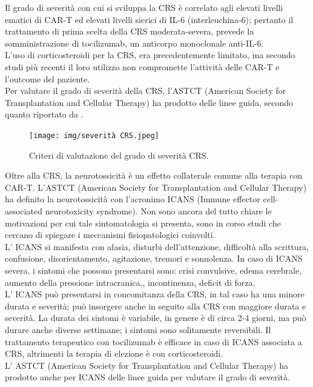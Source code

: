 Il grado di severità con cui si sviluppa la CRS è correlato agli elevati livelli ematici di CAR-T ed elevati livelli 
sierici di IL-6 (interleuchina-6); pertanto il trattamento di prima scelta della CRS moderata-severa, 
prevede la somministrazione di tocilizumab, un anticorpo monoclonale anti-IL-6\cite{EMATOCART}.\\
L’uso di corticosteroidi per la CRS, era precedentemente limitato, ma secondo studi più recenti il loro utilizzo 
non compromette l'attività delle CAR-T e l’outcome del paziente\cite{Cortico}.\\
Per valutare il grado di severità della CRS, l’ASTCT (American Society for Transplantation and Cellular Therapy) 
ha prodotto delle linee guida, secondo quanto riportato da \cite{ASTCT}.\\

\begin{figure}[H]
    \begin{center}
    \texttt{[image: img/severità CRS.jpeg]}
    \end{center}
    \caption[Criteri di valutazione del grado di severità CRS.]{Criteri di valutazione del grado di severità CRS.
    \cite{img26}}

\end{figure}

Oltre alla CRS, la neurotossicità è un effetto collaterale comune alla terapia con CAR-T. 
L’ASTCT (American Society for Transplantation and Cellular Therapy) ha definito la neurotossicità con 
l’acronimo ICANS (Immune effector cell-associated neurotoxicity syndrome). Non sono ancora del tutto chiare le 
motivazioni per cui tale sintomatologia si presenta, sono in corso studi che cercano di spiegare i meccanismi 
fisiopatologici coinvolti.\\
L’ ICANS si manifesta con afasia, disturbi dell’attenzione, difficoltà alla scrittura, confusione, disorientamento, 
agitazione, tremori e sonnolenza. In caso di ICANS severa, i sintomi che possono presentarsi sono: crisi convulsive, 
edema cerebrale, aumento della pressione intracranica,, incontinenza, deficit di forza\cite{EMATOCART}.\\
L’ ICANS può presentarsi in concomitanza della CRS, in tal caso ha una minore durata e severità; può insorgere anche 
in seguito alla CRS con maggiore durata e severità. La durata dei sintomi è variabile, in genere è di circa 2-4 giorni,
ma può durare anche diverse settimane; i sintomi sono solitamente reversibili. 
Il trattamento terapeutico con tocilizumab è efficace in caso di ICANS associata a CRS, altrimenti la terapia di 
elezione è con corticosteroidi\cite{EMATOCART}.\\
L’ ASTCT (American Society for Transplantation and Cellular Therapy) 
ha prodotto anche per ICANS delle linee guida per valutare il grado di severità\cite{ASTCT}.\\

